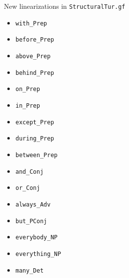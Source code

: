 \documentclass{beamer}
\begin{document}
  \begin{frame}{New linearizations in \texttt{StructuralTur.gf}}
    \scriptsize
    \begin{itemize}
      \item \texttt{with\_Prep}
      \item \texttt{before\_Prep}
      \item \texttt{above\_Prep}
      \item \texttt{behind\_Prep}
      \item \texttt{on\_Prep}
      \item \texttt{in\_Prep}
      \item \texttt{except\_Prep}
      \item \texttt{during\_Prep}
      \item \texttt{between\_Prep}
      \item \texttt{and\_Conj}
      \item \texttt{or\_Conj}
      \item \texttt{always\_Adv}
      \item \texttt{but\_PConj}
      \item \texttt{everybody\_NP}
      \item \texttt{everything\_NP}
      \item \texttt{many\_Det}
    \end{itemize}
    \normalsize
  \end{frame}
\end{document}
